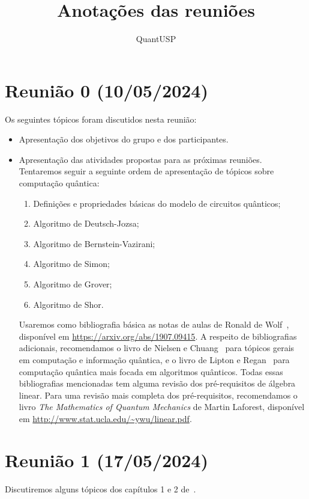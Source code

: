 \documentclass{article}
\title{Anotações das reuniões}
\author{QuantUSP}
\begin{document}
\maketitle

\section*{Reunião 0 (10/05/2024)}

Os seguintes tópicos foram discutidos nesta reunião:
\begin{itemize}
    \item Apresentação dos objetivos do grupo e dos participantes.
    \item Apresentação das atividades propostas para as próximas reuniões.
        Tentaremos seguir a seguinte ordem de apresentação de tópicos sobre computação quântica:
        \begin{enumerate}
            \item Definições e propriedades básicas do modelo de circuitos quânticos;
            \item Algoritmo de Deutsch-Jozsa;
            \item Algoritmo de Bernstein-Vazirani;
            \item Algoritmo de Simon;
            \item Algoritmo de Grover;
            \item Algoritmo de Shor.
        \end{enumerate}
        Usaremos como bibliografia básica as notas de aulas de Ronald de Wolf~\cite{deWolfLectureNotes},
        disponível em \url{https://arxiv.org/abs/1907.09415}.
        A respeito de bibliografias adicionais,
        recomendamos o livro de Nielsen e Chuang~\cite{NielsenChuangQCQI} para tópicos gerais em computação e informação quântica,
        e o livro de Lipton e Regan~\cite{LiptonReganIQALA} para computação quântica mais focada em algoritmos quânticos.
        Todas essas bibliografias mencionadas tem alguma revisão dos pré-requisitos de álgebra linear.
        Para uma revisão mais completa dos pré-requisitos, recomendamos o livro \emph{The Mathematics of Quantum Mechanics} de Martin Laforest,
        disponível em \url{http://www.stat.ucla.edu/~ywu/linear.pdf}.
\end{itemize}

\section*{Reunião 1 (17/05/2024)}

Discutiremos alguns tópicos dos capítulos 1 e 2 de~\cite{deWolfLectureNotes}.



\end{document}
